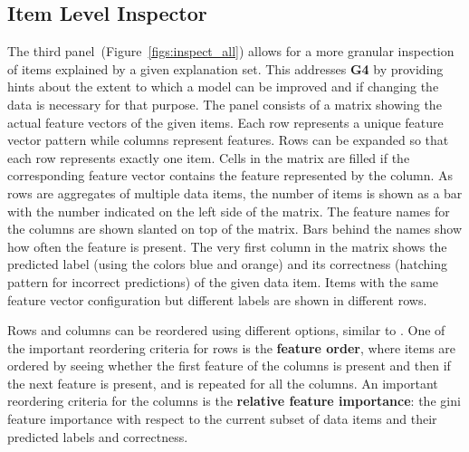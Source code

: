 \subsection{Item Level Inspector}
\label{sec:item_level}
The third panel~(Figure~\ref{figs:inspect_all}) allows for a more granular inspection of items explained by a given explanation set. This addresses \textbf{G4} by providing hints about the extent to which a model can be improved and if changing the data is necessary for that purpose.
The panel consists of a matrix showing the actual feature vectors of the given items.
Each row represents a unique feature vector pattern while columns represent features.
Rows can be expanded so that each row represents exactly one item.
Cells in the matrix are filled if the corresponding feature vector contains the feature represented by the column.
As rows are aggregates of multiple data items, the number of items is shown as a bar with the number indicated on the left side of the matrix.
The feature names for the columns are shown slanted on top of the matrix.
Bars behind the names show how often the feature is present.
The very first column in the matrix shows the predicted label (using the colors blue and orange) and its correctness (hatching pattern for incorrect predictions) of the given data item.
Items with the same feature vector configuration but different labels are shown in different rows.

Rows and columns can be reordered using different options, similar to \tabB.
One of the important reordering criteria for rows is the \textbf{feature order}, where items are ordered by seeing whether the first feature of the columns is present and then if the next feature is present, and is repeated for all the columns.
An important reordering criteria for the columns is the \textbf{relative feature importance}: the gini feature importance with respect to the current subset of data items and their predicted labels and correctness.



